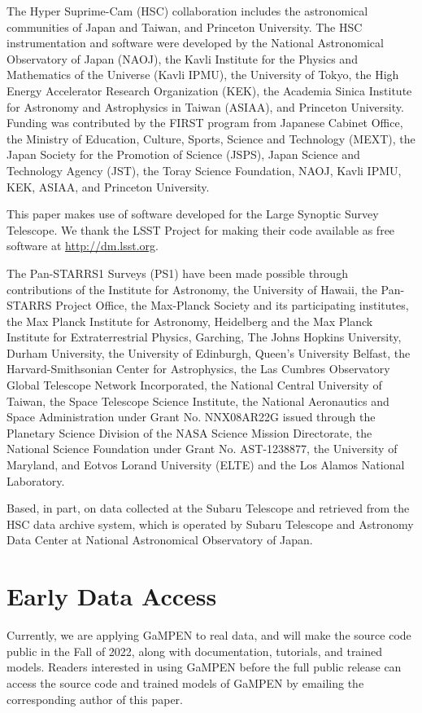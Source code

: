 \documentclass[twocolumn]{aastex63}
\newcommand\gampen{GaMPEN}
\begin{document}
\begin{CJK*}{UTF8}{gbsn}
The Hyper Suprime-Cam (HSC) collaboration includes the astronomical communities of Japan and Taiwan, and Princeton University. The HSC instrumentation and software were developed by the National Astronomical Observatory of Japan (NAOJ), the Kavli Institute for the Physics and Mathematics of the Universe (Kavli IPMU), the University of Tokyo, the High Energy Accelerator Research Organization (KEK), the Academia Sinica Institute for Astronomy and Astrophysics in Taiwan (ASIAA), and Princeton University. Funding was contributed by the FIRST program from Japanese Cabinet Office, the Ministry of Education, Culture, Sports, Science and Technology (MEXT), the Japan Society for the Promotion of Science (JSPS), Japan Science and Technology Agency (JST), the Toray Science Foundation, NAOJ, Kavli IPMU, KEK, ASIAA, and Princeton University. 

This paper makes use of software developed for the Large Synoptic Survey Telescope. We thank the LSST Project for making their code available as free software at  \href{http://dm.lsst.org}{http://dm.lsst.org}.

The Pan-STARRS1 Surveys (PS1) have been made possible through contributions of the Institute for Astronomy, the University of Hawaii, the Pan-STARRS Project Office, the Max-Planck Society and its participating institutes, the Max Planck Institute for Astronomy, Heidelberg and the Max Planck Institute for Extraterrestrial Physics, Garching, The Johns Hopkins University, Durham University, the University of Edinburgh, Queen’s University Belfast, the Harvard-Smithsonian Center for Astrophysics, the Las Cumbres Observatory Global Telescope Network Incorporated, the National Central University of Taiwan, the Space Telescope Science Institute, the National Aeronautics and Space Administration under Grant No. NNX08AR22G issued through the Planetary Science Division of the NASA Science Mission Directorate, the National Science Foundation under Grant No. AST-1238877, the University of Maryland, and Eotvos Lorand University (ELTE) and the Los Alamos National Laboratory.

Based, in part, on data collected at the Subaru Telescope and retrieved from the HSC data archive system, which is operated by Subaru Telescope and Astronomy Data Center at National Astronomical Observatory of Japan.


\clearpage

\appendix

\section{Early Data Access}\label{sec:ap:data_access}
Currently, we are applying \gampen{} to real data, and will make the source code public in the Fall of 2022, along with documentation, tutorials, and trained models. Readers interested in using \gampen{} before the full public release can access the source code and trained models of \gampen{} by emailing the corresponding author of this paper. 


\end{CJK*}
\end{document}
